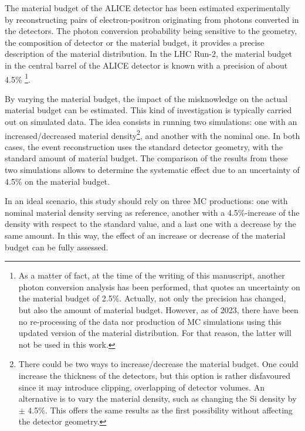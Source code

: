 The material budget of the ALICE detector has been estimated experimentally by reconstructing pairs of electron-positron originating from photons converted in the detectors. The photon conversion probability being sensitive to the geometry, the composition of detector or the material budget, it provides a precise description of the material distribution. In the LHC Run-2, the material budget in the central barrel of the ALICE detector is known with a precision of about 4.5\% \cite{alicecollaborationPerformanceALICEExperiment2014, alicecollaborationValidationALICEMaterial2022}\footnote{As a matter of fact, at the time of the writing of this manuscript, another photon conversion analysis \cite{alicecollaborationDatadrivenPrecisionDetermination2023} has been performed, that quotes an uncertainty on the material budget of 2.5\%. Actually, not only the precision has changed, but also the amount of material budget. However, as of 2023, there have been no re-processing of the data nor production of MC simulations using this updated version of the material distribution. For that reason, the latter will not be used in this work.}. 


By varying the material budget, the impact of the misknowledge on the actual material budget can be estimated. This kind of investigation is typically carried out on simulated data. The idea consists in running two simulations: one with an increased/decreased material density\footnote{There could be two ways to increase/decrease the material budget. One could increase the thickness of the detectors, but this option is rather disfavoured since it may introduce clipping, overlapping of detector volumes. An alternative is to vary the material density, such as changing the Si density by $\pm$ 4.5\%. This offers the same results as the first possibility without affecting the detector geometry.}, and another with the nominal one. In both cases, the event reconstruction uses the standard detector geometry, \ie with the standard amount of material budget. The comparison of the results from these two simulations allows to determine the systematic effect due to an uncertainty of 4.5\% on the material budget.

In an ideal scenario, this study should rely on three MC productions: one with nominal material density serving as reference, another with a 4.5\%-increase of the density with respect to the standard value, and a last one with a decrease by the same amount. In this way, the effect of an increase or decrease of the material budget can be fully assessed. 

